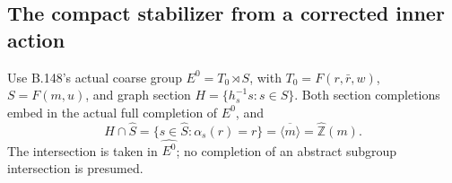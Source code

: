 \subsection*{The compact stabilizer from a corrected inner action}
\label{stmt:B153}
Use B.148's actual coarse group $E^0=T_0\rtimes S$, with
$T_0=F(r,\bar r,w)$, $S=F(m,u)$, and graph section
$H=\{h_s^{-1}s:s\in S\}$. Both section completions embed in the
actual full completion of $E^0$, and
\begin{equation}\label{eq:B153-conclusion}
 \widehat H\cap\widehat S
 =\{s\in\widehat S:\alpha_s(r)=r\}
 =\overline{\langle m\rangle}
 =\widehat{\mathbb Z}(m).
\end{equation}
The intersection is taken in $\widehat{E^0}$; no completion of an
abstract subgroup intersection is presumed.
